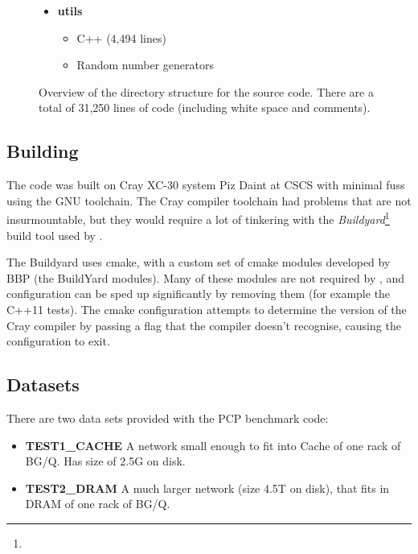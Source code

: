 \begin{figure}[tp!]
{{\begin{itemize}
    \item \textbf{utils}
    \begin{itemize}
        \item C++ (4,494 lines)
        \item Random number generators
    \end{itemize}
\end{itemize}

}}

\caption{Overview of the directory structure for the source code. There are a total of 31,250 lines of code (including white space and comments).}
\label{fig:DirectoryStructure}

\end{figure}

\subsection{Building}
The code was built on Cray XC-30 system Piz Daint at CSCS with minimal fuss using the GNU toolchain.
The Cray compiler toolchain had problems that are not insurmountable, but they would require a lot of tinkering with the \emph{Buildyard}\footnote{} build tool used by \neuron.

The Buildyard uses cmake, with a custom set of cmake modules developed by BBP (the BuildYard modules). Many of these modules are not required by \neuron, and configuration can be sped up significantly by removing them (for example the C++11 tests). The cmake configuration attempts to determine the version of the Cray compiler by passing a flag that the compiler doesn't recognise, causing the configuration to exit.

\subsection{Datasets}
There are two data sets provided with the PCP benchmark code:
\begin{itemize}
    \item \textbf{TEST1\_CACHE} A network small enough to fit into Cache of one rack of BG/Q. Has size of 2.5G on disk.
    \item \textbf{TEST2\_DRAM} A much larger network (size 4.5T on disk), that fits in DRAM of one rack of BG/Q.
\end{itemize}



